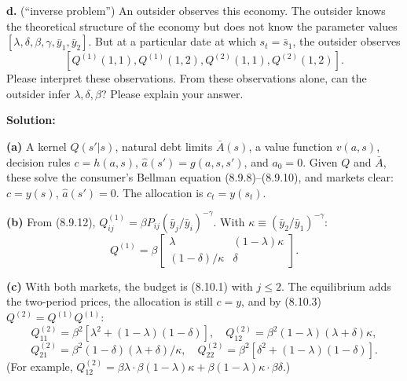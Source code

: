 \documentclass[12pt, letterpaper]{article}
\begin{document}
\begin{tcolorbox}[evenbox,title={Exercise 8.28 \quad Recovering probabilities from prices, IV}]
\begin{tcolorbox}[questionbox]
\textbf{d.} (``inverse problem'') An outsider observes this economy. The outsider knows the theoretical
structure of the economy but does not know the parameter values $[\lambda,\delta,\beta,\gamma,\bar y_1,\bar y_2]$. But at
a particular date at which $s_t=\bar s_1$, the outsider observes
\[
[Q^{(1)}(1,1),Q^{(1)}(1,2),Q^{(2)}(1,1),Q^{(2)}(1,2)].
\]
Please interpret these observations. From these observations alone, can the outsider infer $\lambda,\delta,\beta$?
Please explain your answer.
\end{tcolorbox}

\textbf{Solution:}

\textbf{(a)} A kernel $Q(s'|s)$, natural debt limits $\bar A(s)$, a value function $v(a,s)$, decision rules
$c=h(a,s)$, $\hat a(s')=g(a,s,s')$, and $a_0=0$. Given $Q$ and $\bar A$, these solve the consumer's Bellman
equation (8.9.8)--(8.9.10), and markets clear: $c=y(s)$, $\hat a(s')=0$. The allocation is $c_t=y(s_t)$.

\textbf{(b)} From (8.9.12), $Q^{(1)}_{ij}=\beta P_{ij}(\bar y_j/\bar y_i)^{-\gamma}$. With $\kappa\equiv(\bar y_2/\bar y_1)^{-\gamma}$:
\[
Q^{(1)}=\beta\begin{bmatrix}\lambda&(1-\lambda)\kappa\\(1-\delta)/\kappa&\delta\end{bmatrix}.
\]

\textbf{(c)} With both markets, the budget is (8.10.1) with $j\le2$. The equilibrium adds the two-period prices, the
allocation is still $c=y$, and by (8.10.3) $Q^{(2)}=Q^{(1)}Q^{(1)}$:
\[
Q^{(2)}_{11}=\beta^2[\lambda^2+(1-\lambda)(1-\delta)],\quad Q^{(2)}_{12}=\beta^2(1-\lambda)(\lambda+\delta)\kappa,
\]
\[
Q^{(2)}_{21}=\beta^2(1-\delta)(\lambda+\delta)/\kappa,\quad Q^{(2)}_{22}=\beta^2[\delta^2+(1-\lambda)(1-\delta)].
\]
(For example, $Q^{(2)}_{12}=\beta\lambda\cdot\beta(1-\lambda)\kappa+\beta(1-\lambda)\kappa\cdot\beta\delta$.)


\end{tcolorbox}
\end{document}

